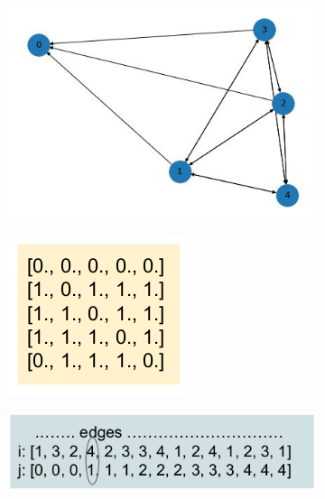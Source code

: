 	\begin{figure}[ht]
	\centering
	\begin{subfigure}{.3\textwidth}
		\centering
		\includegraphics[width=0.9\linewidth]{figure_ml/adj_matrix}
	\end{subfigure}%
	\begin{subfigure}{.3\textwidth}
		\centering
		\includegraphics[width=0.9\linewidth]{figure_ml/adj2}
	\end{subfigure}%
	\begin{subfigure}{.3\textwidth}
		\centering
		\includegraphics[width=0.9\linewidth]{figure_ml/adj3}
	\end{subfigure}
\end{figure}
\FloatBarrier

